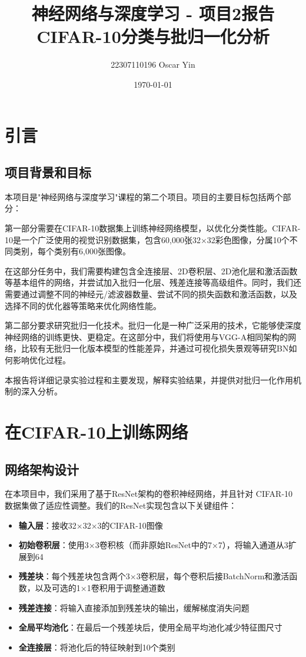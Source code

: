 \documentclass[12pt,a4paper]{article}
\title{神经网络与深度学习 - 项目2报告\\CIFAR-10分类与批归一化分析}
\author{22307110196 Oscar Yin}
\date{\today}
\begin{document}
\maketitle
\tableofcontents
\newpage

\section{引言}
\subsection{项目背景和目标}
本项目是"神经网络与深度学习"课程的第二个项目。项目的主要目标包括两个部分：

第一部分需要在CIFAR-10数据集上训练神经网络模型，以优化分类性能。CIFAR-10是一个广泛使用的视觉识别数据集，包含60,000张32×32彩色图像，分属10个不同类别，每个类别有6,000张图像。

在这部分任务中，我们需要构建包含全连接层、2D卷积层、2D池化层和激活函数等基本组件的网络，并尝试加入批归一化层、残差连接等高级组件。同时，我们还需要通过调整不同的神经元/滤波器数量、尝试不同的损失函数和激活函数，以及选择不同的优化器等策略来优化网络性能。

第二部分要求研究批归一化技术。批归一化是一种广泛采用的技术，它能够使深度神经网络的训练更快、更稳定。在这部分中，我们将使用与VGG-A相同架构的网络，比较有无批归一化版本模型的性能差异，并通过可视化损失景观等研究BN如何影响优化过程。

本报告将详细记录实验过程和主要发现，解释实验结果，并提供对批归一化作用机制的深入分析。

\section{在CIFAR-10上训练网络}

\subsection{网络架构设计}

在本项目中，我们采用了基于ResNet架构\cite{resnet}的卷积神经网络，并且针对 CIFAR-10 数据集做了适应性调整。我们的ResNet实现包含以下关键组件：

\begin{itemize}
    \item \textbf{输入层}：接收32×32×3的CIFAR-10图像
    \item \textbf{初始卷积层}：使用3×3卷积核（而非原始ResNet中的7×7），将输入通道从3扩展到64
    \item \textbf{残差块}：每个残差块包含两个3×3卷积层，每个卷积后接BatchNorm和激活函数，以及可选的1×1卷积用于调整通道数
    \item \textbf{残差连接}：将输入直接添加到残差块的输出，缓解梯度消失问题
    \item \textbf{全局平均池化}：在最后一个残差块后，使用全局平均池化减少特征图尺寸
    \item \textbf{全连接层}：将池化后的特征映射到10个类别
\end{itemize}
\end{document}
